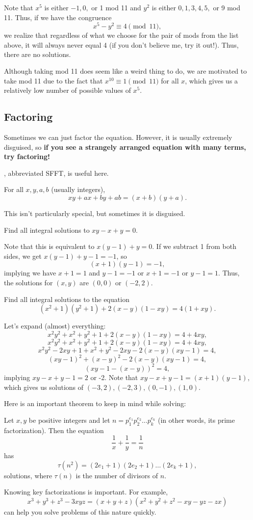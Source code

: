 \documentclass{article}
\begin{document}
\begin{sol}
Note that $x^5$ is either $-1,0,$ or 1 mod 11 and $y^2$ is either $0,1,3,4,5,$ or 9 mod 11. Thus, if we have the congruence
$$x^5-y^2\equiv 4\pmod{11},$$
we realize that regardless of what we choose for the pair of mods from the list above, it will always never equal 4 (if you don't believe me, try it out!). Thus, there are no solutions.
\end{sol}
\begin{remark}
Although taking mod 11 does seem like a weird thing to do, we are motivated to take mod 11 due to the fact that $x^{10}\equiv1\pmod{11}$ for all $x$, which gives us a relatively low number of possible values of $x^5$.
\end{remark}
\subsection{Factoring}
Sometimes we can just factor the equation. However, it is usually extremely disguised, so \textbf{if you see a strangely arranged equation with many terms, try factoring!}

, abbreviated SFFT, is useful here.
\begin{theo}[SFFT]
For all $x,y,a,b$ (usually integers),
$$xy+ax+by+ab=(x+b)(y+a).$$
\end{theo}
This isn't particularly special, but sometimes it is disguised.
\begin{exam}
Find all integral solutions to $xy-x+y=0$.
\end{exam}
\begin{sol}
Note that this is equivalent to $x(y-1)+y=0$. If we subtract 1 from both sides, we get $x(y-1)+y-1=-1$, so
$$(x+1)(y-1)=-1,$$
implying we have $x+1=1$ and $y-1=-1$ or $x+1=-1$ or $y-1=1$. Thus, the solutions for $(x,y)$ are $\boxed{(0,0)}$ or $\boxed{(-2,2)}$.
\end{sol}
\begin{exam}[Titu]
Find all integral solutions to the equation
$$(x^2+1)(y^2+1)+2(x-y)(1-xy)=4(1+xy).$$
\end{exam}
\begin{sol}
Let's expand (almost) everything:
$$x^2y^2+x^2+y^2+1+2(x-y)(1-xy)=4+4xy,$$
$$x^2y^2+x^2+y^2+1+2(x-y)(1-xy)=4+4xy,$$
$$x^2y^2-2xy+1+x^2+y^2-2xy-2(x-y)(xy-1)=4,$$
$$(xy-1)^2+(x-y)^2-2(x-y)(xy-1)=4,$$
$$(xy-1-(x-y))^2=4,$$
implying $xy-x+y-1=2$ or -2. Note that $xy-x+y-1=(x+1)(y-1)$, which gives us solutions of $\boxed{(-3,2),(-2,3),(0,-1),(1,0)}$.
\end{sol}
Here is an important theorem to keep in mind while solving:
\begin{theo}
Let $x,y$ be positive integers and let $n=p_1^{e_1}p_2^{e_2}\ldots p_k^{e_k}$ (in other words, its prime factorization). Then the equation
$$\frac{1}{x}+\frac{1}{y}=\frac{1}{n}$$
has
$$\tau(n^2) = (2e_1+1)(2e_2+1)\ldots(2e_k+1),$$
solutions, where $\tau(n)$ is the number of divisors of $n$.
\end{theo}
Knowing key factorizations is important. For example,
$$x^3+y^3+z^3-3xyz=(x+y+z)(x^2+y^2+z^2-xy-yz-zx)$$
can help you solve problems of this nature quickly.
\end{document}
